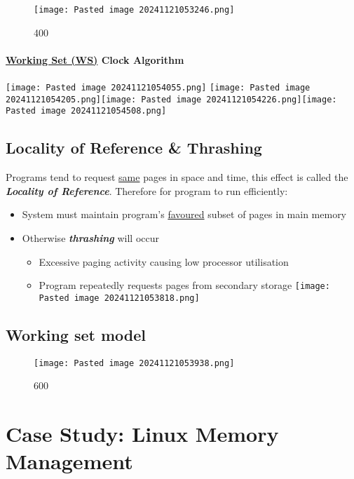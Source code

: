 \begin{figure}
\centering
\texttt{[image: Pasted image 20241121053246.png]}
\caption{400}
\end{figure}

\paragraph*{\texorpdfstring{\ul{Working Set (WS)} Clock
Algorithm}{Working Set (WS) Clock Algorithm}}

\texttt{[image: Pasted image 20241121054055.png]}
\texttt{[image: Pasted image 20241121054205.png]}\texttt{[image: Pasted image 20241121054226.png]}\texttt{[image: Pasted image 20241121054508.png]}

\subsection*{Locality of Reference \& Thrashing}

Programs tend to request \ul{same} pages in space and time, this effect
is called the \textbf{\textit{Locality of Reference}}. Therefore for
program to run efficiently:

\begin{itemize}
\tightlist
\item
  System must maintain program's \ul{favoured} subset of pages in main
  memory
\item
  Otherwise \textbf{\textit{thrashing}} will occur

  \begin{itemize}
  \tightlist
  \item
    Excessive paging activity causing low processor utilisation
  \item
    Program repeatedly requests pages from secondary storage
    \texttt{[image: Pasted image 20241121053818.png]}
  \end{itemize}
\end{itemize}

\subsection*{Working set model}

\begin{figure}
\centering
\texttt{[image: Pasted image 20241121053938.png]}
\caption{600}
\end{figure}

\section*{Case Study: Linux Memory Management}

